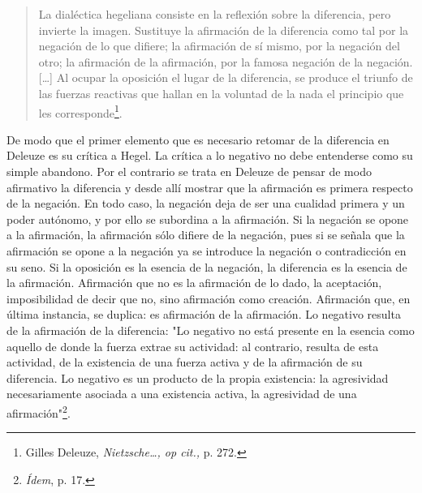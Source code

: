 \documentclass{book}
\begin{document}
\begin{quote}
La dialéctica hegeliana consiste en la reflexión sobre la diferencia,
pero invierte la imagen. Sustituye la afirmación de la diferencia como
tal por la negación de lo que difiere; la afirmación de sí mismo, por la
negación del otro; la afirmación de la afirmación, por la famosa
negación de la negación. {[}\ldots{]} Al ocupar la oposición el lugar de
la diferencia, se produce el triunfo de las fuerzas reactivas que hallan
en la voluntad de la nada el principio que les corresponde\footnote{Gilles
  Deleuze, \emph{Nietzsche\ldots, op cit.,} p. 272.}.
\end{quote}

De modo que el primer elemento que es necesario retomar de la diferencia
en Deleuze es su crítica a Hegel. La crítica a lo negativo no debe
entenderse como su simple abandono. Por el contrario se trata en Deleuze
de pensar de modo afirmativo la diferencia y desde allí mostrar que la
afirmación es primera respecto de la negación. En todo caso, la negación
deja de ser una cualidad primera y un poder autónomo, y por ello se
subordina a la afirmación. Si la negación se opone a la afirmación, la
afirmación sólo difiere de la negación, pues si se señala que la
afirmación se opone a la negación ya se introduce la negación o
contradicción en su seno. Si la oposición es la esencia de la negación,
la diferencia es la esencia de la afirmación. Afirmación que no es la
afirmación de lo dado, la aceptación, imposibilidad de decir que no,
sino afirmación como creación. Afirmación que, en última instancia, se
duplica: es afirmación de la afirmación. Lo negativo resulta de la
afirmación de la diferencia: "Lo negativo no está presente en la esencia
como aquello de donde la fuerza extrae su actividad: al contrario,
resulta de esta actividad, de la existencia de una fuerza activa y de la
afirmación de su diferencia. Lo negativo es un producto de la propia
existencia: la agresividad necesariamente asociada a una existencia
activa, la agresividad de una afirmación"\footnote{\emph{Ídem}, p. 17.}.
\end{document}
